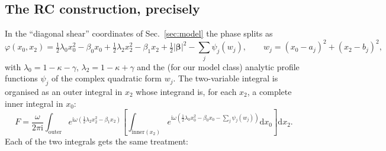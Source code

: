\documentclass[11pt,a4paper]{article}
\newcommand{\Fresnel}{F}
\newcommand{\ii}{\mathrm{i}}
\newcommand{\dd}{\mathrm{d}}
\begin{document}
\subsection{The RC construction, precisely}

In the ``diagonal shear'' coordinates of Sec.~\ref{sec:model} the phase
splits as
\begin{equation}
\varphi(x_0,x_2) = \tfrac12\lambda_0 x_0^2 - \beta_0 x_0
  + \tfrac12\lambda_2 x_2^2 - \beta_1 x_2
  + \tfrac12|\boldsymbol\beta|^2
  - \sum_j \psi_j\!\left(w_j\right),
\qquad
w_j = (x_0-a_j)^2 + (x_2-b_j)^2 ,
\label{eq:split}
\end{equation}
with $\lambda_0 = 1-\kappa-\gamma$, $\lambda_2 = 1-\kappa+\gamma$ and the
(for our model class) analytic profile functions $\psi_j$ of the complex
quadratic form $w_j$.  The two-variable integral is organised as an outer
integral in $x_2$ whose integrand is, for each $x_2$, a complete inner
integral in $x_0$:
\begin{equation}
\Fresnel = \frac{\omega}{2\pi\ii}\int_{\text{outer}}
e^{\ii\omega\left(\frac12\lambda_2 x_2^2-\beta_1x_2\right)}
\left[\int_{\text{inner}(x_2)}
e^{\ii\omega\left(\frac12\lambda_0 x_0^2-\beta_0 x_0
  -\sum_j\psi_j(w_j)\right)}\dd x_0\right]\dd x_2 .
\label{eq:nested}
\end{equation}
Each of the two integrals gets the same treatment:
\end{document}
